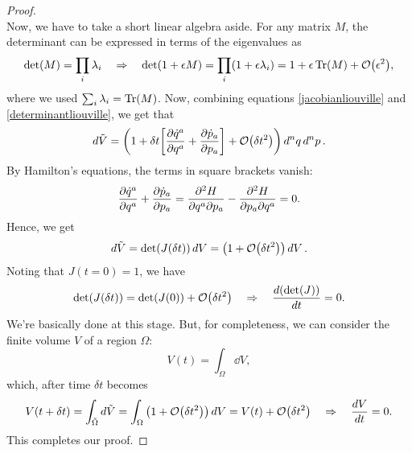 \documentclass{article}
\begin{document}
\begin{proof}
\begin{equation}
	\end{equation}
	Now, we have to take a short linear algebra aside. For any matrix $ M $, the determinant can be expressed in terms of the eigenvalues as
	\begin{equation} \label{determinantliouville}
	\det(M) = \prod_{i} \lambda_{i} \implies \det(1+\epsilon M) = \prod_{i} (1+\epsilon \lambda_{i}) = 1 + \epsilon \Tr(M) + \order{\epsilon^{2}},
	\end{equation}
	where we used $ \sum_{i} \lambda_{i} = \Tr(M) $. Now, combining equations \eqref{jacobianliouville} and \eqref{determinantliouville}, we get that
	\begin{equation}
		\dd{\tilde{V}} = \qty(1 + \delta t  \qty[\pdv{\dot{q}^{a}}{q^{a}} + \pdv{\dot{p}_{a}}{p_{a}}] + \order{\delta t^{2}}) \dd[n]{q} \dd[n]{p}.
	\end{equation}
	By Hamilton's equations, the terms in square brackets vanish:
	\[
	\pdv{\dot{q}^{a}}{q^{a}} + \pdv{\dot{p}_{a}}{p_{a}} = \pdv{H}{q^{a}}{p_{a}} - \pdv{H}{p_{a}}{q^a} = 0.
	\]
	Hence, we get
	\begin{equation} \label{eq:323}
		\dd{\tilde{V}} = \det(J(\delta t))\dd{V} = \qty(1 + \order{\delta t^{2}})\dd{V}.
	\end{equation}
	Noting that $ J(t=0) = 1 $, we have
	\begin{equation}
		\det(J(\delta t) )= \det(J(0)) + \order{\delta t^{2}} \implies \dv{(\det(J))}{t} = 0.
	\end{equation}
	We're basically done at this stage. But, for completeness, we can consider the finite volume $ V $ of a region $ \Omega $:
	\[
		V(t) = \int_{\Omega} \dd{V},
	\]
	which, after time $ \delta t $ becomes
	\[
		V(t+\delta t) = \int_{\tilde{\Omega}} \dd{\tilde{V}} = \int_{\Omega} \qty(1 + \order{\delta t^{2}})\dd{V} = V(t) + \order{\delta t^{2}}  \implies \dv{V}{t} = 0.
	\]
	This completes our proof.
\end{proof}
\end{document}
